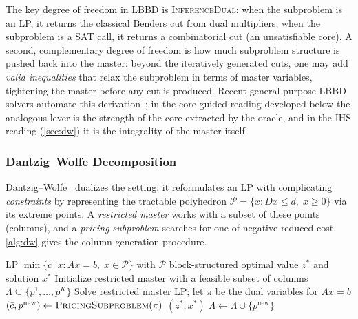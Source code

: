 The key degree of freedom in LBBD is \textsc{InferenceDual}: when the subproblem
is an LP, it returns the classical Benders cut from dual multipliers; when the
subproblem is a SAT call, it returns a combinatorial cut (an unsatisfiable core).
A second, complementary degree of freedom is how much subproblem structure is
pushed back into the master: beyond the iteratively generated cuts, one may add
\emph{valid inequalities} that relax the subproblem in terms of master
variables, tightening the master before any cut is produced. Recent
general-purpose LBBD solvers automate this derivation~\citep{rajendran2026subproblem};
in the core-guided reading developed below the analogous lever is the strength
of the core extracted by the oracle, and in the IHS reading
(\cref{sec:dw}) it is the integrality of the master itself.

\subsubsection{Dantzig--Wolfe Decomposition}

Dantzig--Wolfe~\citep{dantzigwolfe1960} dualizes the setting: it reformulates
an LP with complicating \emph{constraints} by representing the tractable
polyhedron $\mathcal{P} = \{x : Dx \leq d,\; x \geq 0\}$ via its extreme
points. A \emph{restricted master} works with a subset of these points
(columns), and a \emph{pricing subproblem} searches for one of negative reduced
cost. \cref{alg:dw} gives the column generation procedure.

\begin{algorithm}[t]
\caption{Dantzig--Wolfe Decomposition (Column Generation)}
\label{alg:dw}
\begin{algorithmic}[1]
\Require LP $\min\{c^{\top}x : Ax = b,\; x \in \mathcal{P}\}$ with $\mathcal{P}$ block-structured
\Ensure optimal value $z^*$ and solution $x^*$
\State Initialize restricted master with a feasible subset of columns $\Lambda \subseteq \{p^1,\ldots,p^K\}$
\Loop
    \State Solve restricted master LP; let $\pi$ be the dual variables for $Ax = b$
    \State $(\bar{c}, p^{\mathrm{new}}) \leftarrow \textsc{PricingSubproblem}(\pi)$
        \State \Return $(z^*, x^*)$ 
    \EndIf
    \State $\Lambda \leftarrow \Lambda \cup \{p^{\mathrm{new}}\}$
\EndLoop
\end{algorithmic}
\end{algorithm}

